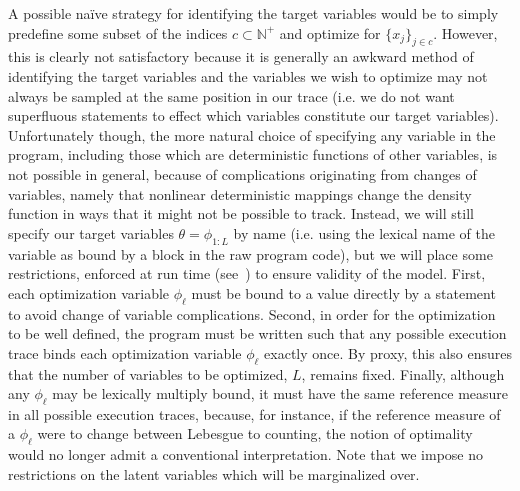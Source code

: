 A possible na\"{i}ve strategy for identifying the target variables
would be to simply predefine some subset of the \sample indices
$c \subset \mathbb{N}^+$ and optimize for $\{x_j \}_{j\in c}$.  However, this is clearly not satisfactory
because it is generally an awkward method of identifying the target variables and the variables we wish
to optimize may not always be sampled at the same position in our trace (i.e. we do not want superfluous
\sample statements to effect which variables constitute our target variables).
Unfortunately though, the more natural choice of specifying any variable in the program, including those
which are deterministic functions of other variables, is not possible in general, because of complications
originating from changes of variables, namely that nonlinear deterministic mappings change the density
function in ways that it might not be possible to track.  Instead, we will still specify our target variables
$\theta = \phi_{1:L}$ by name (i.e. using the lexical name of the variable as bound by a  block in
the raw program code), but we will place some restrictions, enforced at run time (see~\cite{rainforth2017boppArxiv})
to ensure validity of the model.  First, each optimization variable $\phi_{\ell}$ must be bound to a value directly 
by a \sample statement to avoid change of variable complications.
Second, in order for the optimization to be well defined, the program must be written such that any 
possible execution trace binds each optimization variable $\phi_{\ell}$ exactly once.  By proxy, this also
ensures that the number of variables to be optimized, $L$, remains fixed.
Finally, although any $\phi_{\ell}$ may be lexically multiply bound, it must have the same reference 
measure in all possible execution traces, because, for instance, if the reference measure of 
a $\phi_{\ell}$ were to change between Lebesgue to counting, the notion of optimality would 
no longer admit a conventional interpretation.  Note that we impose no restrictions on the latent
variables which will be marginalized over.

